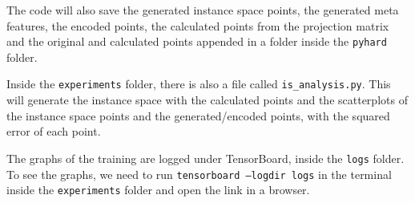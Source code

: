 The code will also save the generated instance space points, the generated meta features, the encoded points, the calculated points from the projection matrix and the original and calculated points appended in a folder inside the \texttt{pyhard} folder.

Inside the \texttt{experiments} folder, there is also a file called \texttt{is\_analysis.py}. This will generate the instance space with the calculated points and the scatterplots of the instance space points and the generated/encoded points, with the squared error of each point.

The graphs of the training are logged under TensorBoard, inside the \texttt{logs} folder. To see the graphs, we need to run \texttt{tensorboard --logdir logs} in the terminal inside the \texttt{experiments} folder and open the link in a browser.